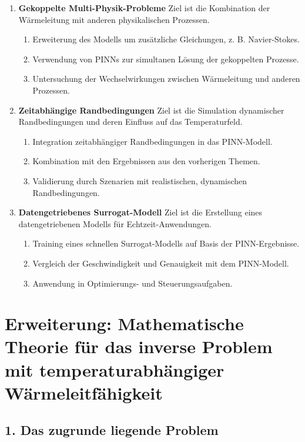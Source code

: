 \begin{enumerate}
	\item \textbf{Gekoppelte Multi-Physik-Probleme}  
	Ziel ist die Kombination der Wärmeleitung mit anderen physikalischen Prozessen.  
	\begin{enumerate}
		\item Erweiterung des Modells um zusätzliche Gleichungen, z. B. Navier-Stokes.  
		\item Verwendung von PINNs zur simultanen Lösung der gekoppelten Prozesse.  
		\item Untersuchung der Wechselwirkungen zwischen Wärmeleitung und anderen Prozessen.  
	\end{enumerate}
	
	\item \textbf{Zeitabhängige Randbedingungen}  
	Ziel ist die Simulation dynamischer Randbedingungen und deren Einfluss auf das Temperaturfeld.  
	\begin{enumerate}
		\item Integration zeitabhängiger Randbedingungen in das PINN-Modell.  
		\item Kombination mit den Ergebnissen aus den vorherigen Themen.  
		\item Validierung durch Szenarien mit realistischen, dynamischen Randbedingungen.  
	\end{enumerate}
	
	\item \textbf{Datengetriebenes Surrogat-Modell}  
	Ziel ist die Erstellung eines datengetriebenen Modells für Echtzeit-Anwendungen.  
	\begin{enumerate}
		\item Training eines schnellen Surrogat-Modells auf Basis der PINN-Ergebnisse.  
		\item Vergleich der Geschwindigkeit und Genauigkeit mit dem PINN-Modell.  
		\item Anwendung in Optimierungs- und Steuerungsaufgaben.  
	\end{enumerate}
\end{enumerate}

\section*{Erweiterung: Mathematische Theorie für das inverse Problem mit temperaturabhängiger Wärmeleitfähigkeit}

\subsection*{1. Das zugrunde liegende Problem}

